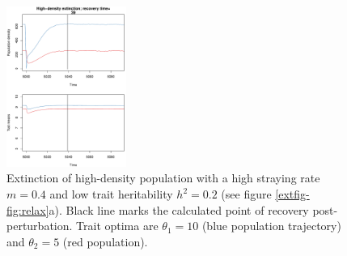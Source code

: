 \documentclass{revtex4}
\begin{document}
\begin{figure}
  \captionsetup{justification=raggedright,
singlelinecheck=false
}
\centering
\includegraphics[width=0.35\textwidth]{figs2/fig_relax_large.pdf}
\caption{
Extinction of high-density population with a high straying rate $m=0.4$ and low trait heritability $h^2=0.2$ (see figure \ref{extfig-fig:relax}a).
Black line marks the calculated point of recovery post-perturbation.
Trait optima are $\theta_1 = 10$ (blue population trajectory) and $\theta_2 = 5$ (red population).
} \label{fig:relaxtraj_hdlh}
\end{figure}
% 
% 
\end{document}
